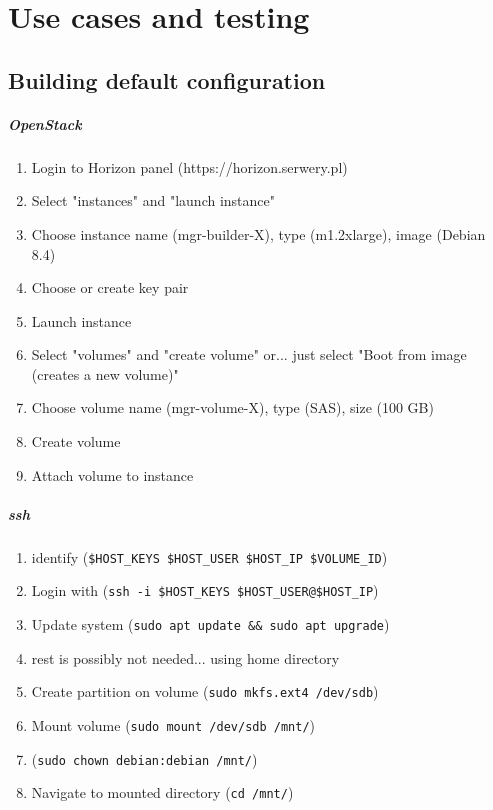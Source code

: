 \documentclass[printmode]{mgr}
\begin{document}
\chapter{Use cases and testing}
\label{chapter:software}

\section{Building default configuration}




\paragraph{OpenStack}

\begin{enumerate}
  \item Login to Horizon panel (https://horizon.serwery.pl)
  \item Select "instances" and "launch instance"
  \item Choose instance name (mgr-builder-X), type (m1.2xlarge), image (Debian 8.4)
  \item Choose or create key pair
  \item Launch instance
  \item Select "volumes" and "create volume" or... just select "Boot from image (creates a new volume)" 
  \item Choose volume name (mgr-volume-X), type (SAS), size (100 GB)
  \item Create volume
  \item Attach volume to instance
\end{enumerate}

\paragraph{ssh}

\begin{enumerate}
  \item identify (\verb|$HOST_KEYS $HOST_USER $HOST_IP $VOLUME_ID|)
  \item Login with (\verb|ssh -i $HOST_KEYS $HOST_USER@$HOST_IP|)
  \item Update system (\verb|sudo apt update && sudo apt upgrade|)
  \item rest is possibly not needed... using home directory
  \item Create partition on volume (\verb|sudo mkfs.ext4 /dev/sdb|)
  \item Mount volume (\verb|sudo mount /dev/sdb /mnt/|)
  \item (\verb|sudo chown debian:debian /mnt/|)
  \item Navigate to mounted directory (\verb|cd /mnt/|)
\end{enumerate}
\end{document}
